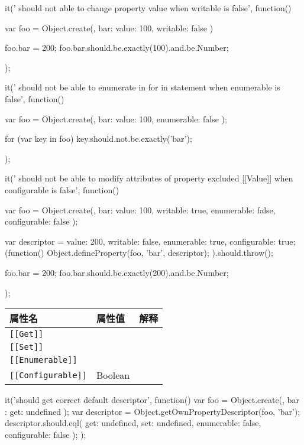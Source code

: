 \begin{JavaScript}
		it(' should not able to change property value when writable is false', function(){
			var foo = Object.create({}, {
				bar: {value: 100, writable: false}
			})

			foo.bar = 200;
			foo.bar.should.be.exactly(100).and.be.Number;
		});
\end{JavaScript}

\begin{JavaScript}
		it(' should not be able to enumerate in for in statement when enumerable is false', function(){
			var foo = Object.create({}, {
				bar: {value: 100, enumerable: false}
			});

			for (var key in foo)
			{
				key.should.not.be.exactly('bar');
			}
		});
\end{JavaScript}

\begin{JavaScript}
		it(' should not be able to modify attributes of property excluded [[Value]] when configurable is false', function(){
			var foo = Object.create({}, {
				bar: {value: 100, writable: true, enumerable: false, configurable: false}
			});

			var descriptor = {value: 200, writable: false, enumerable: true, configurable: true};
			(function(){
				Object.defineProperty(foo, 'bar', descriptor);
			}).should.throw();

			foo.bar = 200;
			foo.bar.should.be.exactly(200).and.be.Number;			
		});
\end{JavaScript}

\begin{tabular}{|l|l|l|}
\hline
属性名 & 属性值 & 解释 \\
\hline
\lstinline![[Get]]! & & \\
\hline
\lstinline![[Set]]! & & \\
\hline
\lstinline![[Enumerable]]! & & \\
\hline
\lstinline![[Configurable]]! & Boolean & \\
\hline
\end{tabular}

\begin{JavaScript}
		it('should get correct default descriptor', function(){
			var foo = Object.create({}, {
				bar : {get: undefined}
			});
			var descriptor = Object.getOwnPropertyDescriptor(foo, 'bar');
			descriptor.should.eql({
				get: undefined,
				set: undefined,
				enumerable: false,
				configurable: false
			});
		});
\end{JavaScript}

